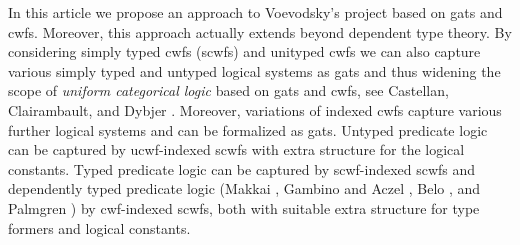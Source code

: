 \documentclass{easychair}
\def\Sigmaext{{\Sigma^\mathrm{ext}}}
\def\Sigmaint{{\Sigma^\mathrm{up}}}
\def\TText{{\mathbf{TT}^\mathrm{ext}}}
\def\TTint{{\mathbf{TT}^\mathrm{up}}}
\begin{document}
In this article we propose an approach to Voevodsky's project based on gats and cwfs. Moreover, this approach actually extends beyond dependent type theory. By considering simply typed cwfs (scwfs) and unityped cwfs we can also capture various simply typed and untyped logical systems as gats and thus widening the scope of {\em uniform categorical logic} based on gats and cwfs, see Castellan, Clairambault, and Dybjer \cite{castellan:lambek}.
Moreover, variations of indexed cwfs capture various further logical systems and can be formalized as gats. Untyped predicate logic can be captured by ucwf-indexed scwfs with extra structure for the logical constants. Typed predicate logic can be captured by scwf-indexed scwfs and dependently typed predicate logic (Makkai \cite{makkai:folds}, Gambino and Aczel \cite{gambino-aczel}, Belo \cite{belo}, and Palmgren \cite{Palmgren19}) by cwf-indexed scwfs, both with suitable extra structure for type formers and logical constants.

%
%


\end{document}
